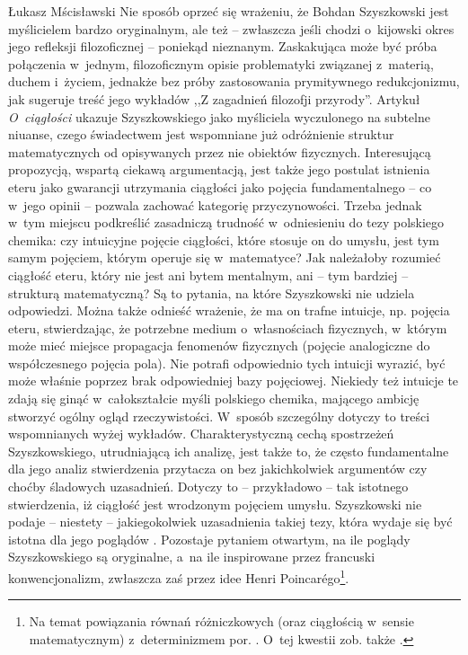 \begin{artplenv}{Łukasz Mścisławski}
\noindent Nie sposób oprzeć się wrażeniu, że Bohdan Szyszkowski jest myślicielem bardzo oryginalnym, ale też -- zwłaszcza jeśli chodzi o~kijowski okres jego refleksji filozoficznej -- poniekąd nieznanym. Zaskakująca może być próba połączenia w~jednym, filozoficznym opisie problematyki związanej z~materią, duchem i~życiem, jednakże bez próby zastosowania prymitywnego redukcjonizmu, jak sugeruje treść jego wykładów ,,Z zagadnień filozofji przyrody''. Artykuł \textit{O~ciągłości} ukazuje Szyszkowskiego jako myśliciela wyczulonego na subtelne niuanse, czego świadectwem jest wspomniane już odróżnienie struktur matematycznych od opisywanych przez nie obiektów fizycznych. Interesującą propozycją, wspartą ciekawą argumentacją, jest także jego postulat istnienia eteru jako gwarancji utrzymania ciągłości jako pojęcia fundamentalnego -- co w~jego opinii -- pozwala zachować kategorię przyczynowości. Trzeba jednak w~tym miejscu podkreślić zasadniczą trudność w~odniesieniu do tezy polskiego chemika: czy intuicyjne pojęcie ciągłości, które stosuje on do umysłu, jest tym samym pojęciem, którym operuje się w~matematyce? Jak należałoby rozumieć ciągłość eteru, który nie jest ani bytem mentalnym, ani -- tym bardziej -- strukturą matematyczną? Są to pytania, na które Szyszkowski nie udziela odpowiedzi. Można także odnieść wrażenie, że ma on trafne intuicje, np. pojęcia eteru, stwierdzając, że potrzebne medium o~własnościach fizycznych, w~którym może mieć miejsce propagacja fenomenów fizycznych (pojęcie analogiczne do współczesnego pojęcia pola). Nie potrafi odpowiednio tych intuicji wyrazić, być może właśnie poprzez brak odpowiedniej bazy pojęciowej. Niekiedy też intuicje te zdają się ginąć w~całokształcie myśli polskiego chemika, mającego ambicję stworzyć ogólny ogląd rzeczywistości. W~sposób szczególny dotyczy to treści wspomnianych wyżej wykładów. Charakterystyczną cechą spostrzeżeń Szyszkowskiego, utrudniającą ich analizę, jest także to, że często fundamentalne dla jego analiz stwierdzenia przytacza on bez jakichkolwiek argumentów czy choćby śladowych uzasadnień. Dotyczy to -- przykładowo -- tak istotnego stwierdzenia, iż ciągłość jest wrodzonym pojęciem umysłu. Szyszkowski nie podaje -- niestety -- jakiegokolwiek uzasadnienia takiej tezy, która wydaje się być istotna dla jego poglądów
\parencite[por.][s.~47]{szyszkowski_o_1916}. %
Pozostaje pytaniem otwartym, na ile poglądy Szyszkowskiego są oryginalne, a~na ile inspirowane przez francuski konwencjonalizm, zwłaszcza zaś przez idee Henri
Poincarégo\footnote{Na temat powiązania równań różniczkowych (oraz ciągłością w~sensie matematycznym) z~determinizmem por. 
\parencites[][s.~98–135]{poincare_nauka_1908}[][s.~98–135, 160–169]{poincare_wartosc_1908}. O~tej kwestii zob. także 
\parencite[][s.~80–81]{leszczynski_wprowadzenie_2003}.}.


\end{artplenv}
